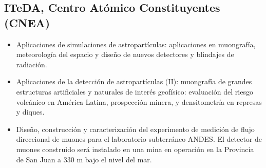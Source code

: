 \subsection*{ITeDA, Centro Atómico Constituyentes (CNEA)}
\begin{itemize}
	\item Aplicaciones de simulaciones de astropartículas: aplicaciones en muongrafía, meteorología del espacio y diseño de nuevos detectores y blindajes de radiación.
	\item Aplicaciones de la detección de astropartículas (II): muongrafía de grandes estructuras artificiales y naturales de interés geofísico: evaluación del riesgo volcánico en América Latina, prospección minera, y densitometría en represas y diques.
	\item Diseño, construcción y caracterización del experimento de medición de flujo direccional de muones para el laboratorio subterráneo ANDES. El detector de muones construido será instalado en una mina en operación en la Provincia de San Juan a 330 m bajo el nivel del mar.
\end{itemize}

